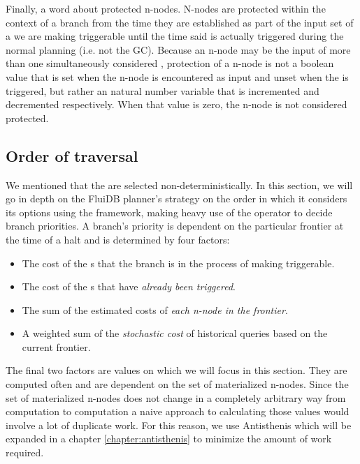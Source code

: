 Finally, a word about protected n-nodes. N-nodes are protected within the
context of a branch from the time they are established as part of the
input set of a  we are making triggerable until the time said
 is actually triggered during the normal planning (i.e. not
the GC). Because an n-node may be the input of more than one
simultaneously considered , protection of a n-node is not a
boolean value that is set when the n-node is encountered as 
input and unset when the  is triggered, but rather an natural
number variable that is incremented and decremented respectively. When
that value is zero, the n-node is not considered protected.


\subsection{Order of traversal}

We mentioned that the  are selected
non-deterministically. In this section, we will go in depth on the
FluiDB planner's strategy on the order in which it considers its
options using the  framework, making heavy use of the
 operator to decide branch priorities. A branch's priority
is dependent on the particular frontier at the time of a halt and is
determined by four factors:

\begin{itemize}
\item The cost of the s that the branch is in the process
  of making triggerable.
\item The cost of the s that have \emph{already been triggered}.
\item The sum of the estimated costs of \emph{each n-node in the frontier}.
\item A weighted sum of the \emph{stochastic cost} of historical queries based
on the current frontier.
\end{itemize}

The final two factors are values on which we will focus in this
section. They are computed often and are dependent on the set of
materialized n-nodes. Since the set of materialized n-nodes does not
change in a completely arbitrary way from computation to computation a
naive approach to calculating those values would involve a lot of
duplicate work. For this reason, we use Antisthenis which will be
expanded in a chapter \ref{chapter:antisthenis} to minimize the amount
of work required.

